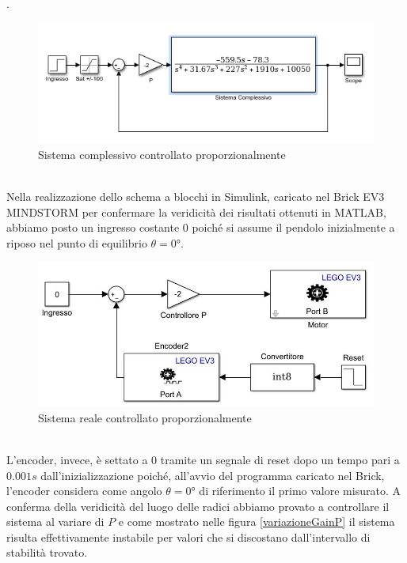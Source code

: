 .
\begin{figure}[ht]
	\centering
	\includegraphics[width=\textwidth]{SisComplessivoPNRetroazionato.PNG}
	\caption{Sistema complessivo controllato proporzionalmente}
	\label{SisComplessivoPNRetroazionato}
\end{figure}
\\Nella realizzazione dello schema a blocchi in Simulink, caricato nel Brick EV3 MINDSTORM per confermare la veridicità dei risultati ottenuti in MATLAB, abbiamo posto un ingresso costante 0 poiché si assume il pendolo inizialmente a riposo nel punto di equilibrio $\theta=\ang{0}$.
\begin{figure}[ht]
	\centering
	\includegraphics[width=\textwidth]{pendoloReale.jpg}
	\caption{Sistema reale controllato proporzionalmente}
	\label{pendoloReale}
\end{figure}
\\L'encoder, invece, è settato a $0$ tramite un segnale di reset dopo un tempo pari a $0.001s$ dall'inizializzazione poiché, all'avvio del programma caricato nel Brick, l'encoder considera come angolo $\theta=\ang{0}$ di riferimento il primo valore misurato.
\newpage
A conferma della veridicità del luogo delle radici abbiamo provato a controllare il sistema al variare di $P$ e come mostrato nelle figura \ref{variazioneGainP} il sistema risulta effettivamente instabile per valori che si discostano dall'intervallo di stabilità trovato.
